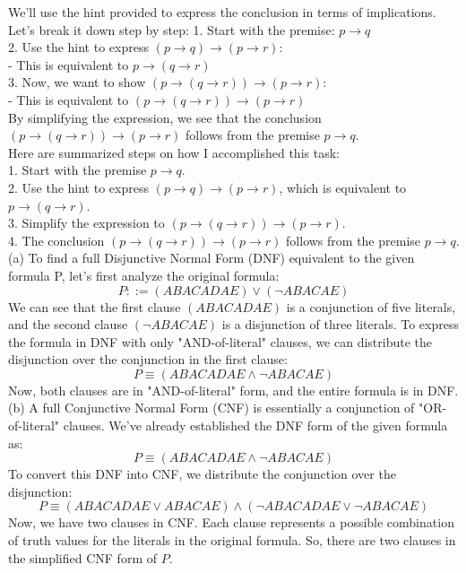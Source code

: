 \documentclass{article}
\begin{document}
We'll use the hint provided to express the conclusion in terms of implications. Let's break it down step by step:
1. Start with the premise: \( p \rightarrow q \)\\
2. Use the hint to express \( (p \rightarrow q) \rightarrow (p \rightarrow r) \):\\
  - This is equivalent to \( p \rightarrow (q \rightarrow r) \)\\
3. Now, we want to show \( (p \rightarrow (q \rightarrow r)) \rightarrow (p \rightarrow r) \):\\
  - This is equivalent to \( (p \rightarrow (q \rightarrow r)) \rightarrow (p \rightarrow r) \)\\
 
By simplifying the expression, we see that the conclusion \( (p \rightarrow (q \rightarrow r)) \rightarrow (p \rightarrow r) \) follows from the premise \( p \rightarrow q \).\\

Here are summarized steps on how I accomplished this task:\\
1. Start with the premise \( p \rightarrow q \).\\
2. Use the hint to express \( (p \rightarrow q) \rightarrow (p \rightarrow r) \), which is equivalent to \( p \rightarrow (q \rightarrow r) \).\\
3. Simplify the expression to \( (p \rightarrow (q \rightarrow r)) \rightarrow (p \rightarrow r) \).\\
4. The conclusion \( (p \rightarrow (q \rightarrow r)) \rightarrow (p \rightarrow r) \) follows from the premise \( p \rightarrow q \).\\

(a) To find a full Disjunctive Normal Form (DNF) equivalent to the given formula P, let's first analyze the original formula:
\[ P ::= (ABACADAE) \lor (\lnot ABACAE) \]
We can see that the first clause \((ABACADAE)\) is a conjunction of five literals, and the second clause \((\lnot ABACAE)\) is a disjunction of three literals. To express the formula in DNF with only "AND-of-literal" clauses, we can distribute the disjunction over the conjunction in the first clause:
\[ P \equiv (ABACADAE \land \lnot ABACAE) \]
Now, both clauses are in "AND-of-literal" form, and the entire formula is in DNF.
(b) A full Conjunctive Normal Form (CNF) is essentially a conjunction of "OR-of-literal" clauses. We've already established the DNF form of the given formula as:
\[ P \equiv (ABACADAE \land \lnot ABACAE) \]
To convert this DNF into CNF, we distribute the conjunction over the disjunction:
\[ P \equiv (ABACADAE \lor ABACAE) \land (\lnot ABACADAE \lor \lnot ABACAE) \]
Now, we have two clauses in CNF. Each clause represents a possible combination of truth values for the literals in the original formula.
So, there are two clauses in the simplified CNF form of \(P\).
\end{document}
